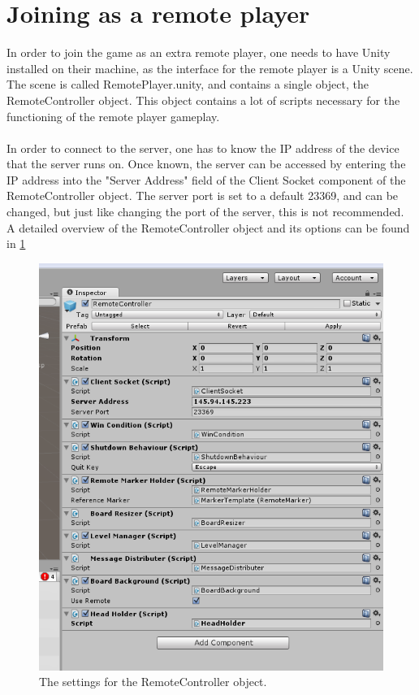 \documentclass[]{report}
\begin{document}
\section*{Joining as a remote player}
In order to join the game as an extra remote player, one needs to have Unity
installed on their machine, as the interface for the remote player is a Unity
scene. The scene is called RemotePlayer.unity, and contains a single object,
the RemoteController object. This object contains a lot of scripts necessary
for the functioning of the remote player gameplay.\\
\\
In order to connect to the server, one has to know the IP address of the
device that the server runs on. Once known, the server can be accessed by
entering the IP address into the "Server Address" field of the Client Socket
component of the RemoteController object. The server port is set to a default
23369, and can be changed, but just like changing the port of the server,
this is not recommended. A detailed overview of the RemoteController object
and its options can be found in \ref{fig:remotecontroller}
\begin{figure}[!ht]
    \centering
    \includegraphics[scale = 0.6]{RemoteController}
    \caption{The settings for the RemoteController object.}
    \label{fig:remotecontroller}
\end{figure}
\end{document}
